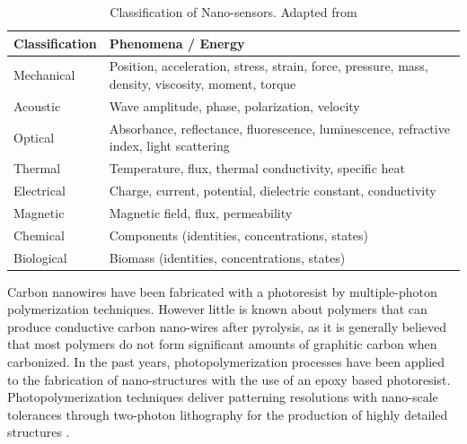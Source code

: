 \begin{table}[ht]
\centering
\caption[Classification of Nano-sensors]{Classification of Nano-sensors. Adapted from \cite{Khanna2016}}
\begin{tabularx}{\textwidth}{lX}
\hline
\textbf{Classification} & \textbf{Phenomena / Energy} \\
\hline
Mechanical & Position, acceleration, stress, strain, force, pressure, mass, density, viscosity, moment, torque \\
Acoustic & Wave amplitude, phase, polarization, velocity \\
Optical & Absorbance, reflectance, fluorescence, luminescence, refractive index, light scattering \\
Thermal & Temperature, flux, thermal conductivity, specific heat \\
Electrical & Charge, current, potential, dielectric constant, conductivity \\
Magnetic & Magnetic field, flux, permeability \\
Chemical & Components (identities, concentrations, states) \\
Biological & Biomass (identities, concentrations, states) \\
\hline
\end{tabularx}
\label{tab:classificationOfNanosensors}
\end{table}

Carbon nanowires have been fabricated with a photoresist by multiple-photon polymerization techniques. However little is known about polymers that can produce conductive carbon nano-wires after pyrolysis, as it is generally believed that most polymers do not form significant amounts of graphitic carbon when carbonized.
In the past years, photopolymerization processes have been applied to the fabrication of nano-structures with the use of an epoxy based photoresist. \cite{Boer2014} Photopolymerization techniques deliver patterning resolutions with nano-scale tolerances through two-photon lithography for the production of highly detailed structures \cite{Hribar2014}.

